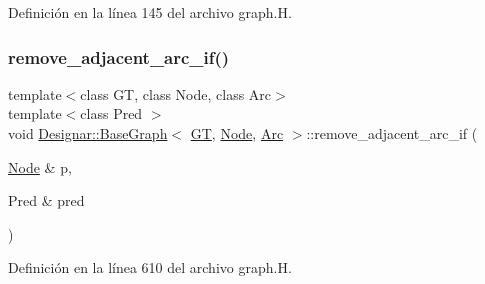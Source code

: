 Definición en la línea 145 del archivo graph.\+H.

\mbox{\label{class_designar_1_1_base_graph_af1653bc8e50c53d27997951798a8a716}} 
\subsubsection{\texorpdfstring{remove\+\_\+adjacent\+\_\+arc\+\_\+if()}{remove\_adjacent\_arc\_if()}\hspace{0.1cm}{\footnotesize\ttfamily [1/2]}}
{\footnotesize\ttfamily template$<$class GT, class Node, class Arc$>$ \\
template$<$class Pred $>$ \\
void \hyperlink{class_designar_1_1_base_graph}{Designar\+::\+Base\+Graph}$<$ \hyperlink{demo-buildgraph_8_c_a3001c40d2c31ca87ed96cd7d1334a55e}{GT}, \hyperlink{namespace_designar_a5af326c65aa2bd26b26c410f2030d09e}{Node}, \hyperlink{namespace_designar_a3f55fb5513d62ff47cbc8f72b8e95d6f}{Arc} $>$\+::remove\+\_\+adjacent\+\_\+arc\+\_\+if (\begin{DoxyParamCaption}\item[{\hyperlink{namespace_designar_a5af326c65aa2bd26b26c410f2030d09e}{Node} \&}]{p,  }\item[{Pred \&}]{pred }\end{DoxyParamCaption})\hspace{0.3cm}{\ttfamily [inline]}}



Definición en la línea 610 del archivo graph.\+H.

\mbox{\label{class_designar_1_1_base_graph_a10423075ea81c629e88974fa882ec903}} 
